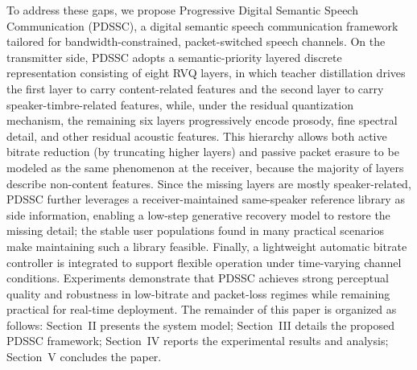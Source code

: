 \documentclass[lettersize,journal]{IEEEtran}
\begin{document}
To address these gaps, we propose Progressive Digital Semantic Speech Communication (PDSSC), a digital semantic speech communication framework tailored for bandwidth-constrained, packet-switched speech channels. On the transmitter side, PDSSC adopts a semantic-priority layered discrete representation consisting of eight RVQ layers, in which teacher distillation drives the first layer to carry content-related features and the second layer to carry speaker-timbre-related features, while, under the residual quantization mechanism, the remaining six layers progressively encode prosody, fine spectral detail, and other residual acoustic features. This hierarchy allows both active bitrate reduction (by truncating higher layers) and passive packet erasure to be modeled as the same phenomenon at the receiver, because the majority of layers describe non-content features. Since the missing layers are mostly speaker-related, PDSSC further leverages a receiver-maintained same-speaker reference library as side information, enabling a low-step generative recovery model to restore the missing detail; the stable user populations found in many practical scenarios make maintaining such a library feasible. Finally, a lightweight automatic bitrate controller is integrated to support flexible operation under time-varying channel conditions. Experiments demonstrate that PDSSC achieves strong perceptual quality and robustness in low-bitrate and packet-loss regimes while remaining practical for real-time deployment. The remainder of this paper is organized as follows: Section~II presents the system model; Section~III details the proposed PDSSC framework; Section~IV reports the experimental results and analysis; Section~V concludes the paper.
\end{document}
